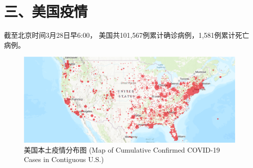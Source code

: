 \documentclass[11,]{article}
\begin{document}
\begin{figure}[htbp]
\centering  %
\caption{}
\label{Fig.main}
\end{figure}

\hypertarget{section-4}{%
\section{\texorpdfstring{\textcolor{glaucous}{三、美国疫情}}{}}\label{section-4}}

截至北京时间3⽉28⽇早6:00，
美国共101,567例累计确诊病例，1,581例累计死亡病例。

\begin{figure}[htbp] 
\centering %
\includegraphics[]{./test/covid4.png} %
\caption{美国本土疫情分布图 (Map of Cumulative Confirmed COVID-19 Cases in Contiguous U.S.)} %
\label{} %
\end{figure}
\end{document}
